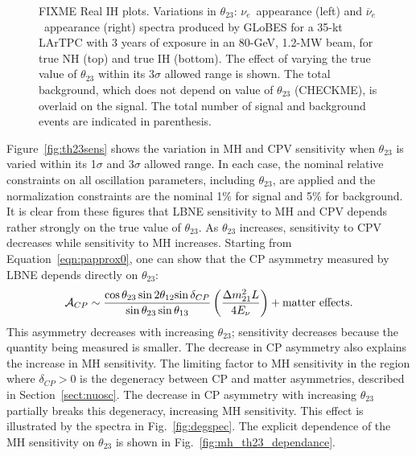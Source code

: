 \documentclass[letterpaper,11pt]{article}
\begin{document}
\begin{figure}[!htb]
  \caption{FIXME Real IH plots.
  Variations in $\theta_{23}$:
  $\nu_e$~appearance (left) and $\overline{\nu}_e$~appearance (right) spectra 
  produced by GLoBES for a 35-kt LArTPC with 3 years of 
  exposure in an 80-GeV, 1.2-MW beam,  for true NH (top) and true IH (bottom).  
  The effect of varying the true
  value of $\theta_{23}$ within its 3$\sigma$ allowed range is shown. 
  The total background, which does not depend on value of $\theta_{23}$ (CHECKME), 
  is overlaid on the signal. The total number
  of signal and background events are indicated in parenthesis.}
  \label{fig:th23spec}
\end{figure}
Figure~\ref{fig:th23sens} shows the variation in MH and CPV sensitivity when $\theta_{23}$
is varied within its 1$\sigma$ and 3$\sigma$ allowed range. In each case, the 
nominal relative constraints on all oscillation parameters, including $\theta_{23}$, 
are applied and the normalization constraints are the nominal
1\% for signal and 5\% for background. It is clear from these figures that LBNE 
sensitivity to MH and CPV depends rather strongly on the true value of $\theta_{23}$.
As $\theta_{23}$ increases, sensitivity to CPV decreases while sensitivity to
MH increases. Starting from Equation~\ref{eqn:papprox0}, one can show
that the CP asymmetry measured by LBNE depends directly on
$\theta_{23}$:
\begin{equation}
\mathcal{A}_{CP} \sim \frac{\cos \theta_{23} \sin 2 \theta_{12}
  {\sin \delta_{CP}}}{\sin \theta_{23} \sin \theta_{13}}
\left(\frac{\Delta m^2_{21} L}{ 4 E_{\nu}}\right) + {\rm matter
  \ effects}.
\end{equation}
This asymmetry decreases with increasing $\theta_{23}$; sensitivity decreases
because the quantity being measured is smaller. The decrease in CP asymmetry also
explains the increase in MH sensitivity. The limiting factor to MH sensitivity
in the region where $\delta_{CP}>0$ is the degeneracy between CP and matter
asymmetries, described in Section~\ref{sect:nuosc}. The decrease in CP asymmetry
with increasing $\theta_{23}$ partially breaks this degeneracy, increasing MH
sensitivity. This effect is illustrated by the spectra in Fig.~\ref{fig:degspec}.
The explicit dependence of the MH sensitivity on $\theta_{23}$ is shown in 
Fig.~\ref{fig:mh_th23_dependance}.
%
\end{document}
